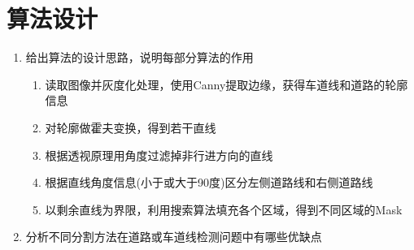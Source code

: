 \documentclass[a4paper]{ctexart}
\begin{document}
  \section{算法设计}
    \begin{enumerate}
      \item 给出算法的设计思路，说明每部分算法的作用
      \begin{enumerate}
        \item 读取图像并灰度化处理，使用Canny提取边缘，获得车道线和道路的轮廓信息
        \item 对轮廓做霍夫变换，得到若干直线
        \item 根据透视原理用角度过滤掉非行进方向的直线
        \item 根据直线角度信息(小于或大于90度)区分左侧道路线和右侧道路线
        \item 以剩余直线为界限，利用搜索算法填充各个区域，得到不同区域的Mask
      \end{enumerate}
      \item 分析不同分割方法在道路或车道线检测问题中有哪些优缺点
    \end{enumerate}
\end{document}
